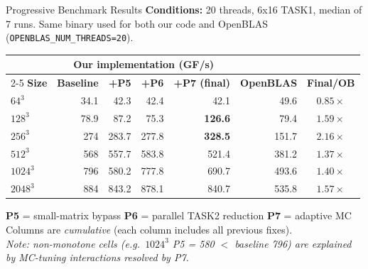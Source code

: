 \documentclass[aspectratio=169]{beamer}
\begin{document}
\begin{frame}{Progressive Benchmark Results}
  \textbf{Conditions:} 20 threads, 6x16 TASK1, median of 7 runs.
  Same binary used for both our code and OpenBLAS (\texttt{OPENBLAS\_NUM\_THREADS=20}).
  \vspace{0.15cm}

  \begin{table}
    \centering
    \footnotesize
    \begin{tabular}{lrrrrrc}
      \toprule
      & \multicolumn{4}{c}{\textbf{Our implementation (GF/s)}} & & \\
      \cmidrule(lr){2-5}
      \textbf{Size} & \textbf{Baseline} & \textbf{+P5} & \textbf{+P6} & \textbf{+P7 (final)} & \textbf{OpenBLAS} & \textbf{Final/OB} \\
      \midrule
      $64^3$    & 34.1 & \textcolor{good}{42.3} & 42.4 & 42.1  & 49.6 & $0.85\times$ \\
      $128^3$   & 78.9 & 87.2 & 75.3 & \textcolor{good}{\textbf{126.6}} & 79.4  & \textcolor{good}{$\mathbf{1.59\times}$} \\
      $256^3$   & 274  & 283.7 & 277.8 & \textcolor{good}{\textbf{328.5}} & 151.7 & \textcolor{good}{$\mathbf{2.16\times}$} \\
      $512^3$   & 568  & 557.7 & 583.8 & 521.4 & 381.2 & \textcolor{good}{$\mathbf{1.37\times}$} \\
      $1024^3$  & 796  & 580.2 & 777.8 & 690.7 & 493.6 & \textcolor{good}{$\mathbf{1.40\times}$} \\
      $2048^3$  & 884  & 843.2 & 878.1 & 840.7 & 535.8 & \textcolor{good}{$\mathbf{1.57\times}$} \\
      \bottomrule
    \end{tabular}
  \end{table}
  \vspace{0.1cm}
  \footnotesize
  \textbf{P5} = small-matrix bypass \quad \textbf{P6} = parallel TASK2 reduction \quad \textbf{P7} = adaptive MC\\
  Columns are \textit{cumulative} (each column includes all previous fixes).\\
  \textit{Note: non-monotone cells (e.g.\ $1024^3$ P5 = 580 $<$ baseline 796) are explained by MC-tuning
  interactions resolved by P7.}
\end{frame}
\end{document}
